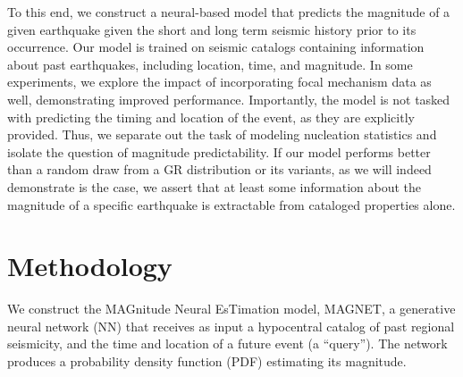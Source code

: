 \documentclass[pdflatex]{sn-jnl}
\newcommand{\neri}[1]{{\textcolor{cyan}{#1}}}
\begin{document}

To this end, we construct a neural-based model that predicts the magnitude of a given earthquake given the short and long term seismic history prior to its occurrence. Our model is trained on seismic catalogs containing information about past earthquakes, including location, time, and magnitude. In some experiments, we explore the impact of incorporating focal mechanism data as well, demonstrating improved performance. Importantly, the model is not tasked with predicting the timing and location of the event, as they are explicitly provided. Thus, we separate out the task of modeling nucleation statistics and isolate the question of magnitude predictability. If our model performs better than a random draw from a GR distribution or its variants, as we will indeed demonstrate is the case, we assert that at least some information about the magnitude of a specific earthquake is extractable from cataloged properties alone. 





\section{Methodology}
We construct the MAGnitude Neural EsTimation model, MAGNET, a generative neural network (NN) that receives as input a hypocentral catalog of past regional seismicity, and the time and location of a future event (a ``query''). The network produces a probability density function (PDF) estimating its magnitude. 
\end{document}

